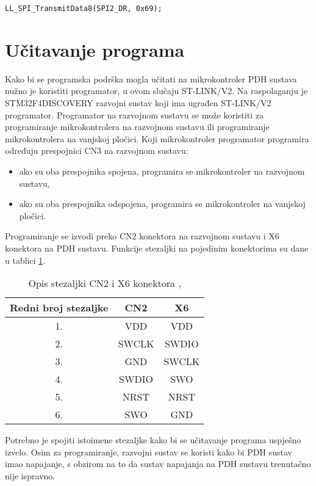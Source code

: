 \begin{lstlisting}[caption=Ispravan upis podatka u SPI2\_DR registar, lable={lst:spi_dr_new}]
LL_SPI_TransmitData8(SPI2_DR, 0x69);
\end{lstlisting}

\section{Učitavanje programa}

Kako bi se programska podrška mogla učitati na mikrokontroler PDH sustava nužno je koristiti programator, u ovom slučaju ST-LINK/V2. Na raspolaganju je \\ STM32F4DISCOVERY razvojni sustav koji ima ugrađen ST-LINK/V2 programator. Programator na razvojnom sustavu se može koristiti za programiranje mikrokontrolera na razvojnom sustavu ili programiranje mikrokontrolera na vanjskoj pločici. Koji mikrokontroler programator programira određuju prespojnici CN3 na razvojnom sustavu:
\begin{itemize}
	\item ako su oba prespojnika spojena, programira se mikrokontroler na razvojnom sustavu,
	\item ako su oba prespojnika odspojena, programira se mikrokontroler na vanjskoj pločici.
\end{itemize}
Programiranje se izvodi preko CN2 konektora na razvojnom sustavu i X6 konektora na PDH sustavu. Funkcije stezaljki na pojedinim konektorima su dane u tablici \ref{Tab:conn_func}.
\begin{center}
	\begin{table}[H]
		\centering
		\caption{Opis stezaljki CN2 i X6 konektora \cite{zavrsni_filip_juric}, \cite{disc_manual}}
		\begin{tabular}{| c | c | c |}
			\hline
			Redni broj stezaljke & CN2 & X6 \\
			\hline
			1. & VDD & VDD \\
			\hline
			2. & SWCLK & SWDIO \\
			\hline
			3. & GND & SWCLK \\
			\hline
			4. & SWDIO & SWO \\
			\hline
			5. & NRST & NRST \\
			\hline
			6. & SWO & GND \\
			\hline
		\end{tabular}
		\label{Tab:conn_func}
	\end{table}
\end{center}
Potrebno je spojiti istoimene stezaljke kako bi se učitavanje programa uspješno izvelo. Osim za programiranje, razvojni sustav se koristi kako bi PDH sustav imao napajanje, s obzirom na to da sustav napajanja na PDH sustavu trenutačno nije ispravno.